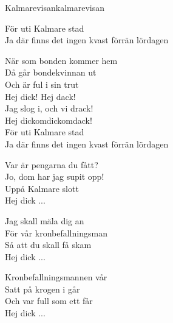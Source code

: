 \begin{song}{Kalmarevisan}{kalmarevisan}
\begin{vers}
För uti Kalmare stad\\
Ja där finns det ingen kvast förrän lördagen\\
\end{vers}
\begin{vers}
\repopen När som bonden kommer hem\\
Då går bondekvinnan ut \repclose\\
Och är ful i sin trut\\
Hej dick! Hej dack!\\
Jag slog i, och vi drack!\\
\repopen Hej dickomdickomdack! \repclose\\
För uti Kalmare stad\\
Ja där finns det ingen kvast förrän lördagen\\
\end{vers}
\begin{vers}
\repopen Var är pengarna du fått?\\
Jo, dom har jag supit opp! \repclose\\
Uppå Kalmare slott\\
Hej dick ...\\
\end{vers}
\begin{vers}
\repopen Jag skall mäla dig an\\
För vår kronbefallningsman \repclose\\
Så att du skall få skam\\
Hej dick ...\\
\end{vers}
\begin{vers}
\repopen Kronbefallningsmannen vår\\
Satt på krogen i går \repclose\\
Och var full som ett får\\
Hej dick ...\\
\end{vers}
\end{song}
